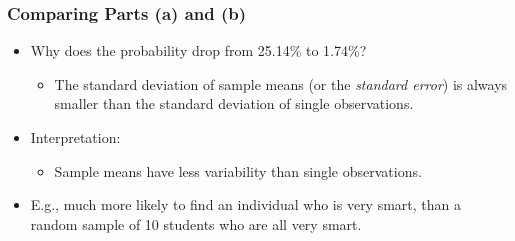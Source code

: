 \documentclass[12pt]{beamer}
\begin{document}
\begin{frame}
	\frametitle{Comparing Parts (a) and (b)}
	
	\begin{itemize}[label={\color{blue}$\blacktriangleright$}]
		\item Why does the probability drop from 25.14\% to 1.74\%?
		\begin{itemize}[label={\color{blue}$\blacktriangleright$}]
			\item The standard deviation of sample means (or the \textit{standard error}) is always smaller than the standard deviation of single observations.
		\end{itemize}
		
		\item Interpretation:
		\begin{itemize}[label={\color{blue}$\blacktriangleright$}]
			\item Sample means have less variability than single observations.
		\end{itemize}
		
		\item E.g., much more likely to find an individual who is very smart, than a random sample of 10 students who are all very smart.
	\end{itemize}
	
\end{frame}
\end{document}
